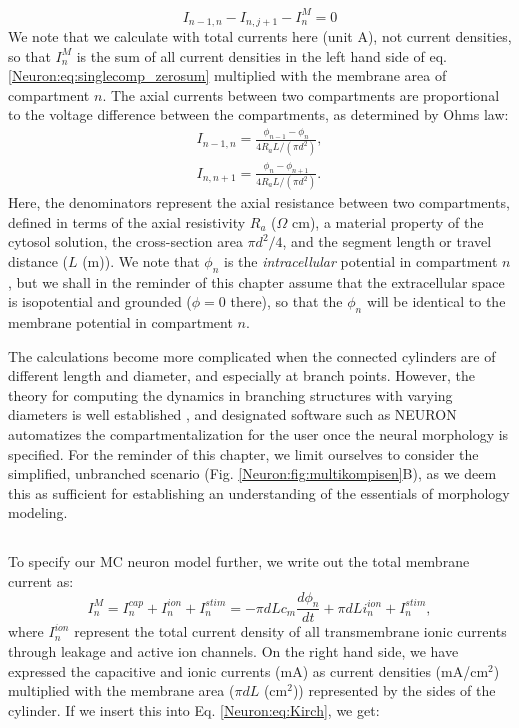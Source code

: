 \begin{equation}
I_{n-1,n} - I_{n,j+1} - I^M_n = 0
\label{Neuron:eq:Kirch}
\end{equation}
We note that we calculate with total currents here (unit A), not current densities, so that $I^M_n$ is the sum of all current densities in the left hand side of eq. \ref{Neuron:eq:singlecomp_zerosum} multiplied with the membrane area of compartment $n$. The axial currents between two compartments are proportional to the voltage difference between the compartments, as determined by Ohms law:
\begin{eqnarray}
I_{n-1,n} = \frac{\phi_{n-1}-\phi_n}{4 R_a L/(\pi d^2)}, \nonumber \\ 
I_{n,n+1} = \frac{\phi_{n}-\phi_{n+1}}{4 R_a L/(\pi d^2)}.
\label{Neuron:eq:axialcurrents}
\end{eqnarray}
Here, the denominators represent the axial resistance between two compartments, defined in terms of the axial resistivity $R_a$ ($\Omega$ cm), a material property of the cytosol solution, the cross-section area $\pi d^2/4$, and the segment length or travel distance ($L$ (m)). We note that $\phi_n$ is the \emph{intracellular} potential in compartment $n$, but we shall in the reminder of this chapter assume that the extracellular space is isopotential and grounded ($\phi = 0$ there), so that the $\phi_n$ will be identical to the membrane potential in compartment $n$.

The calculations become more complicated when the connected cylinders are of different length and diameter, and especially at branch points. However, the theory for computing the dynamics in branching structures with varying diameters is well established \cite{Rall1977,Rall1989}, and designated software such as NEURON \cite{Hines1997,Hines2009} automatizes the compartmentalization for the user once the neural morphology is specified. For the reminder of this chapter, we limit ourselves to consider the simplified, unbranched scenario (Fig. \ref{Neuron:fig:multikompisen}B), as we deem this as sufficient for establishing an understanding of the essentials of morphology modeling. 




\subsection{}
\label{sec:Neuron:Active_multicomp}

To specify our MC neuron model further, we write out the total membrane current as:
\begin{equation}
I^M_n = I_n^{cap} + I_n^{ion} + I_n^{stim} = -\pi d L c_m \frac{d\phi_n}{dt} + \pi d L i_n^{ion} + I_n^{stim}, 
\label{Neuron:eq:Imemb}
\end{equation}
where $I_n^{ion}$ represent the total current density of all transmembrane ionic currents through leakage and active ion channels. On the right hand side, we have expressed the capacitive and ionic currents (mA) as current densities (mA/cm$^2$) multiplied with the membrane area ($\pi d L$ (cm$^2$)) represented by the sides of the cylinder. If we insert this into Eq. \ref{Neuron:eq:Kirch}, we get:

